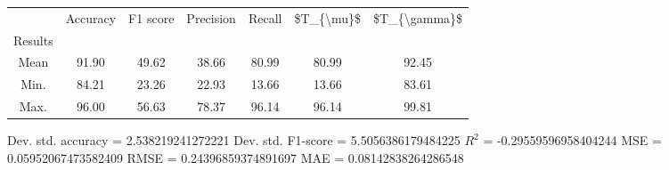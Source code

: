 \begin{tabular}{|c|c|c|c|c|c|c|}
\toprule
{} &  Accuracy &  F1 score &  Precision &  Recall &  \$T\_\{\textbackslash mu\}\$ &  \$T\_\{\textbackslash gamma\}\$ \\
Results &           &           &            &         &            &               \\
\hline
Mean    &     91.90 &     49.62 &      38.66 &   80.99 &      80.99 &         92.45 \\
Min.    &     84.21 &     23.26 &      22.93 &   13.66 &      13.66 &         83.61 \\
Max.    &     96.00 &     56.63 &      78.37 &   96.14 &      96.14 &         99.81 \\
\bottomrule
\end{tabular}

 Dev. std. accuracy = 2.538219241272221
 Dev. std. F1-score = 5.5056386179484225
 $R^2$ = -0.29559596958404244
 MSE = 0.05952067473582409
 RMSE = 0.24396859374891697
 MAE = 0.08142838264286548
